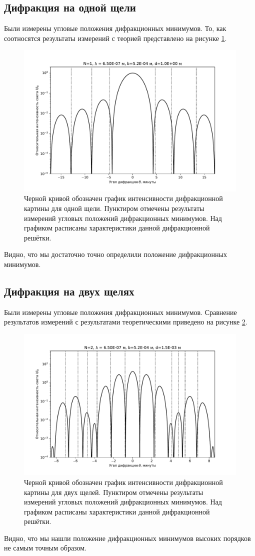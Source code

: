 \documentclass[12pt]{article}
\begin{document}
	\subsection{Дифракция на одной щели}
	Были измерены угловые положения дифракционных минимумов. То, как соотносятся результаты измерений с теорией представлено на рисунке \ref{fig:figure2}.
	\begin{figure}[ht]
		\centering
		\includegraphics[width=0.7\linewidth]{../plots/dif_1}
		\caption{Черной кривой обозначен график интенсивности дифракционной картины для одной щели. Пунктиром отмечены результаты измерений угловых положений дифракционных минимумов. Над графиком расписаны характеристики данной дифракционной решётки.}
		\label{fig:figure2}
	\end{figure}
	Видно, что мы достаточно точно определили положение дифракционных минимумов.
	
	\subsection{Дифракция на двух щелях}
	Были измерены угловые положения дифракционных минимумов. Сравнение результатов измерений с результатами теоретическими приведено на рисунке \ref{fig:figure3}.
	\begin{figure}[ht]
		\centering
		\includegraphics[width=0.7\linewidth]{../plots/dif_2}
		\caption{Черной кривой обозначен график интенсивности дифракционной картины для двух щелей. Пунктиром отмечены результаты измерений угловых положений дифракционных минимумов. Над графиком расписаны характеристики данной дифракционной решётки.}
		\label{fig:figure3}
	\end{figure}
	Видно, что мы нашли положение дифракционных минимумов высоких порядков не самым точным образом.
\end{document}

